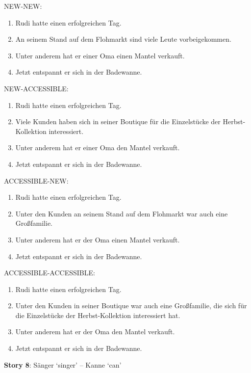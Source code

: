 NEW-NEW:

\begin{enumerate}
\item Rudi hatte einen erfolgreichen Tag.
\item An seinem Stand auf dem Flohmarkt sind viele Leute vorbeigekommen.
\item Unter anderem hat er einer Oma einen Mantel verkauft.
\item Jetzt entspannt er sich in der Badewanne.
\end{enumerate}

NEW-ACCESSIBLE:

\begin{enumerate}
\item Rudi hatte einen erfolgreichen Tag.
\item Viele Kunden haben sich in seiner Boutique für die Einzelstücke der Herbst-Kollektion interessiert.
\item Unter anderem hat er einer Oma den Mantel verkauft.
\item Jetzt entspannt er sich in der Badewanne.
\end{enumerate}

ACCESSIBLE-NEW:

\begin{enumerate}
\item Rudi hatte einen erfolgreichen Tag.
\item Unter den Kunden an seinem Stand auf dem Flohmarkt war auch eine Großfamilie.
\item Unter anderem hat er der Oma einen Mantel verkauft.
\item Jetzt entspannt er sich in der Badewanne.
\end{enumerate}

ACCESSIBLE-ACCESSIBLE:

\begin{enumerate}
\item Rudi hatte einen erfolgreichen Tag.
\item Unter den Kunden in seiner Boutique war auch eine Großfamilie, die sich für die Einzelstücke der Herbst-Kollektion interessiert hat.
\item Unter anderem hat er der Oma den Mantel verkauft.
\item Jetzt entspannt er sich in der Badewanne.
\end{enumerate}

\textbf{Story 8}: Sänger `singer' – Kanne `can'\\

